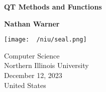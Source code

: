 \documentclass{report}
\title{\Huge{}}
\author{\huge{Nathan Warner}}
\date{\huge{}}
\begin{document}
        \begin{titlepage}
       \begin{center}
           \vspace*{1cm}
    
           \textbf{QT Methods and Functions}
    
           \vspace{0.5cm}
            
                
           \vspace{1.5cm}
    
           \textbf{Nathan Warner}
    
           \vfill
                
                
           \vspace{0.8cm}
         
           \texttt{[image: ~/niu/seal.png]}
                
           Computer Science \\
           Northern Illinois University\\
           December 12, 2023 \\
           United States\\
                
       \end{center}
    \end{titlepage}
    \tableofcontents
    \pagebreak 
\end{document}
